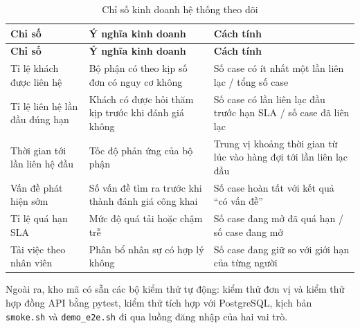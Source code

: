 {\small
\renewcommand{\arraystretch}{1.25}
\begin{longtable}{|>{\raggedright\arraybackslash}p{4.6cm}|>{\raggedright\arraybackslash}p{5.2cm}|>{\raggedright\arraybackslash}p{4.4cm}|}
\caption{Chỉ số kinh doanh hệ thống theo dõi}\label{tab:kpi}\\ \hline
\textbf{Chỉ số} & \textbf{Ý nghĩa kinh doanh} & \textbf{Cách tính} \\ \hline \endfirsthead
\hline \textbf{Chỉ số} & \textbf{Ý nghĩa kinh doanh} & \textbf{Cách tính} \\ \hline \endhead
Tỉ lệ khách được liên hệ & Bộ phận có theo kịp số đơn có nguy cơ không & Số case có ít nhất một lần liên lạc / tổng số case \\ \hline
Tỉ lệ liên hệ lần đầu đúng hạn & Khách có được hỏi thăm kịp trước khi đánh giá không & Số case có lần liên lạc đầu trước hạn SLA / số case đã liên lạc \\ \hline
Thời gian tới lần liên hệ đầu & Tốc độ phản ứng của bộ phận & Trung vị khoảng thời gian từ lúc vào hàng đợi tới lần liên lạc đầu \\ \hline
Vấn đề phát hiện sớm & Số vấn đề tìm ra trước khi thành đánh giá công khai & Số case hoàn tất với kết quả ``có vấn đề'' \\ \hline
Tỉ lệ quá hạn SLA & Mức độ quá tải hoặc chậm trễ & Số case đang mở đã quá hạn / số case đang mở \\ \hline
Tải việc theo nhân viên & Phân bổ nhân sự có hợp lý không & Số case đang giữ so với giới hạn của từng người \\ \hline
\end{longtable}
}

Ngoài ra, kho mã có sẵn các bộ kiểm thử tự động: kiểm thử đơn vị và kiểm thử hợp đồng API bằng
pytest, kiểm thử tích hợp với PostgreSQL, kịch bản \texttt{smoke.sh} và \texttt{demo\_e2e.sh} đi
qua luồng đăng nhập của hai vai trò.

